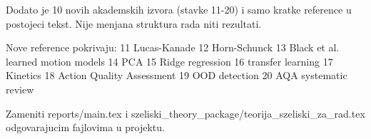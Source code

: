 Dodato je 10 novih akademskih izvora (stavke 11-20) i samo kratke reference u postojeci tekst.
Nije menjana struktura rada niti rezultati.

Nove reference pokrivaju:
11 Lucas-Kanade
12 Horn-Schunck
13 Black et al. learned motion models
14 PCA
15 Ridge regression
16 transfer learning
17 Kinetics
18 Action Quality Assessment
19 OOD detection
20 AQA systematic review

Zameniti reports/main.tex i szeliski_theory_package/teorija_szeliski_za_rad.tex odgovarajucim fajlovima u projektu.
